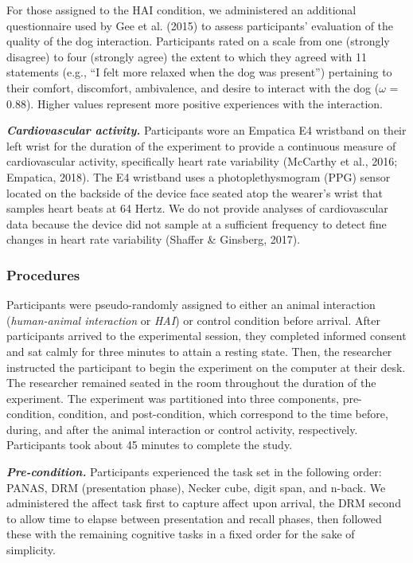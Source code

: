 \documentclass[
  english,
  pub,floatsintext]{apa6}
\begin{document}
For those assigned to the HAI condition, we administered an additional questionnaire used by Gee et al. (2015) to assess participants' evaluation of the quality of the dog interaction. Participants rated on a scale from one (strongly disagree) to four (strongly agree) the extent to which they agreed with 11 statements (e.g., ``I felt more relaxed when the dog was present'') pertaining to their comfort, discomfort, ambivalence, and desire to interact with the dog (\(\omega\) = 0.88). Higher values represent more positive experiences with the interaction.

\textbf{\emph{Cardiovascular activity.}}
Participants wore an Empatica E4 wristband on their left wrist for the duration of the experiment to provide a continuous measure of cardiovascular activity, specifically heart rate variability (McCarthy et al., 2016; Empatica, 2018). The E4 wristband uses a photoplethysmogram (PPG) sensor located on the backside of the device face seated atop the wearer's wrist that samples heart beats at 64 Hertz. We do not provide analyses of cardiovascular data because the device did not sample at a sufficient frequency to detect fine changes in heart rate variability (Shaffer \& Ginsberg, 2017).

\hypertarget{procedures}{%
\subsubsection{Procedures}\label{procedures}}

Participants were pseudo-randomly assigned to either an animal interaction (\emph{human-animal interaction} or \emph{HAI}) or control condition before arrival. After participants arrived to the experimental session, they completed informed consent and sat calmly for three minutes to attain a resting state. Then, the researcher instructed the participant to begin the experiment on the computer at their desk. The researcher remained seated in the room throughout the duration of the experiment. The experiment was partitioned into three components, pre-condition, condition, and post-condition, which correspond to the time before, during, and after the animal interaction or control activity, respectively. Participants took about 45 minutes to complete the study.

\textbf{\emph{Pre-condition.}}
Participants experienced the task set in the following order: PANAS, DRM (presentation phase), Necker cube, digit span, and n-back. We administered the affect task first to capture affect upon arrival, the DRM second to allow time to elapse between presentation and recall phases, then followed these with the remaining cognitive tasks in a fixed order for the sake of simplicity.
\end{document}
